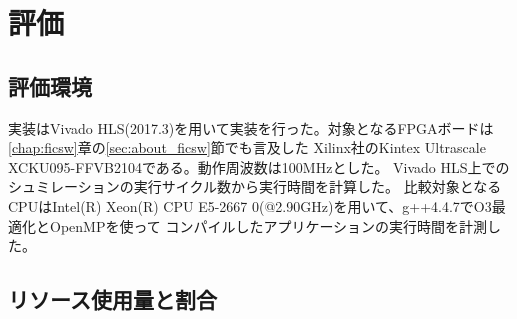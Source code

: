 \chapter{評価}
{
\label{chap:eval}

\section{評価環境}
\label{sec:eval_env}
実装はVivado HLS(2017.3)を用いて実装を行った。対象となるFPGAボードは\ref{chap:ficsw}章の\ref{sec:about_ficsw}節でも言及した
Xilinx社のKintex Ultrascale　XCKU095-FFVB2104である。動作周波数は100MHzとした。
Vivado HLS上でのシュミレーションの実行サイクル数から実行時間を計算した。
比較対象となるCPUはIntel(R) Xeon(R) CPU E5-2667 0(@2.90GHz)を用いて、g++4.4.7でO3最適化とOpenMPを使って
コンパイルしたアプリケーションの実行時間を計測した。

\section{リソース使用量と割合}
\label{sec:resource_util}




}
